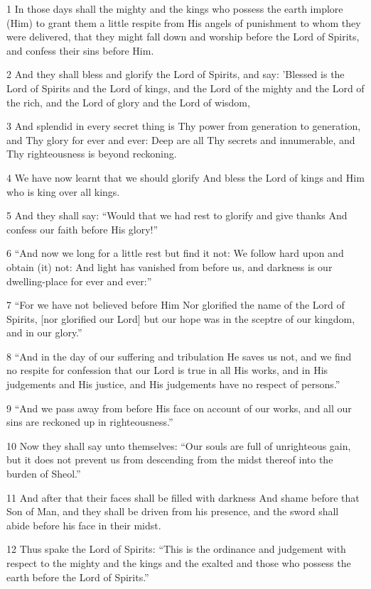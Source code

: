 \par 1 In those days shall the mighty and the kings who possess the earth implore (Him) to grant them a little respite from His angels of punishment to whom they were delivered, that they might fall down and worship before the Lord of Spirits, and confess their sins before Him.
\par 2 And they shall bless and glorify the Lord of Spirits, and say: 'Blessed is the Lord of Spirits and the Lord of kings, and the Lord of the mighty and the Lord of the rich, and the Lord of glory and the Lord of wisdom,
\par 3 And splendid in every secret thing is Thy power from generation to generation, and Thy glory for ever and ever: Deep are all Thy secrets and innumerable, and Thy righteousness is beyond reckoning.
\par 4 We have now learnt that we should glorify And bless the Lord of kings and Him who is king over all kings.
\par 5 And they shall say: “Would that we had rest to glorify and give thanks And confess our faith before His glory!”
\par 6 “And now we long for a little rest but find it not: We follow hard upon and obtain (it) not: And light has vanished from before us, and darkness is our dwelling-place for ever and ever:”
\par 7 “For we have not believed before Him Nor glorified the name of the Lord of Spirits, [nor glorified our Lord] but our hope was in the sceptre of our kingdom, and in our glory.”
\par 8 “And in the day of our suffering and tribulation He saves us not, and we find no respite for confession that our Lord is true in all His works, and in His judgements and His justice, and His judgements have no respect of persons.”
\par 9 “And we pass away from before His face on account of our works, and all our sins are reckoned up in righteousness.”
\par 10 Now they shall say unto themselves: “Our souls are full of unrighteous gain, but it does not prevent us from descending from the midst thereof into the burden of Sheol.”
\par 11 And after that their faces shall be filled with darkness And shame before that Son of Man, and they shall be driven from his presence, and the sword shall abide before his face in their midst.
\par 12 Thus spake the Lord of Spirits: “This is the ordinance and judgement with respect to the mighty and the kings and the exalted and those who possess the earth before the Lord of Spirits.”

